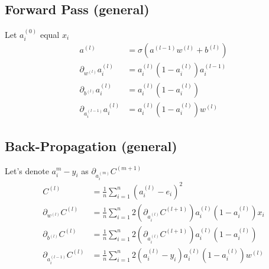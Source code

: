 \documentclass{article}
\numberwithin{equation}{subsection}
\begin{document}
\subsection{Forward Pass (general)}

Let $a_{i}^{(0)}$ equal $x_i$
\begin{align}
  a^{(l)} &= \sigma(a^{(l-1)}w^{(l)} + b^{(l)}) \\
  \partial_{w^{(l)}}a_i^{(l)} &= a_i^{(l)}(1-a_i^{(l)})a_i^{(l-1)} \\  
  \partial_{b^{(l)}}a_i^{(l)} &= a_i^{(l)}(1-a_i^{(l)}) \\
  \partial_{a_i^{(l-1)}}a_i^{(l)} &= a_i^{(l)}(1-a_i^{(l)})w^{(l)}
\end{align}

\subsection{Back-Propagation (general)}

Let's denote $a_{i}^{m} - y_i$ as $\partial_{a_i^{(m)}}C^{(m+1)}$
\begin{align}
  C^{(l)} &= \frac{1}{n}\sum_{i=1}^{n}(a_i^{(l)} - e_i)^2 \\
  \partial_{w^{(l)}}C^{(l)} &= \frac{1}{n}\sum_{i=1}^{n} 2(\partial_{a_i^{(l)}}C^{(l+1)})a_i^{(l)}(1-a_i^{(l)})x_i \\
  \partial_{b^{(l)}}C^{(l)} &= \frac{1}{n}\sum_{i=1}^{n} 2(\partial_{a_i^{(l)}}C^{(l+1)})a_i^{(l)}(1-a_i^{(l)}) \\
  \partial_{a_i^{(l-1)}}C^{(l)} &= \frac{1}{n}\sum_{i=1}^{n}2(a_i^{(l)}-y_i)a_i^{(l)}(1-a_i^{(l)})w^{(l)}
\end{align}
\end{document}
